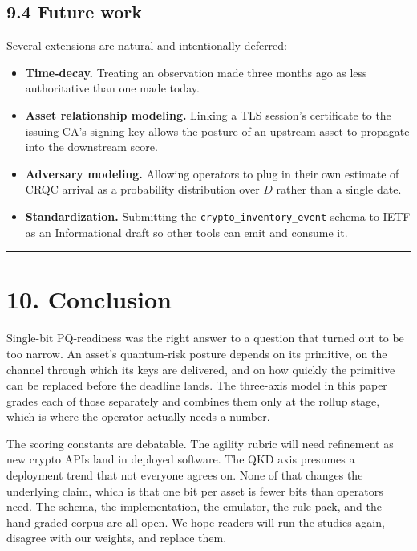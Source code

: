 \subsection{9.4 Future work}\label{future-work}

Several extensions are natural and intentionally deferred:

\begin{itemize}
\tightlist
\item
  \textbf{Time-decay.} Treating an observation made three months ago as
  less authoritative than one made today.
\item
  \textbf{Asset relationship modeling.} Linking a TLS session's
  certificate to the issuing CA's signing key allows the posture of an
  upstream asset to propagate into the downstream score.
\item
  \textbf{Adversary modeling.} Allowing operators to plug in their own
  estimate of CRQC arrival as a probability distribution over \(D\)
  rather than a single date.
\item
  \textbf{Standardization.} Submitting the
  \texttt{crypto\_inventory\_event} schema to IETF as an Informational
  draft so other tools can emit and consume it.
\end{itemize}

\begin{center}\rule{0.5\linewidth}{0.5pt}\end{center}

\section{10. Conclusion}\label{conclusion}

Single-bit PQ-readiness was the right answer to a question that turned
out to be too narrow. An asset's quantum-risk posture depends on its
primitive, on the channel through which its keys are delivered, and on
how quickly the primitive can be replaced before the deadline lands. The
three-axis model in this paper grades each of those separately and
combines them only at the rollup stage, which is where the operator
actually needs a number.

The scoring constants are debatable. The agility rubric will need
refinement as new crypto APIs land in deployed software. The QKD axis
presumes a deployment trend that not everyone agrees on. None of that
changes the underlying claim, which is that one bit per asset is fewer
bits than operators need. The schema, the implementation, the emulator,
the rule pack, and the hand-graded corpus are all open. We hope readers
will run the studies again, disagree with our weights, and replace them.

